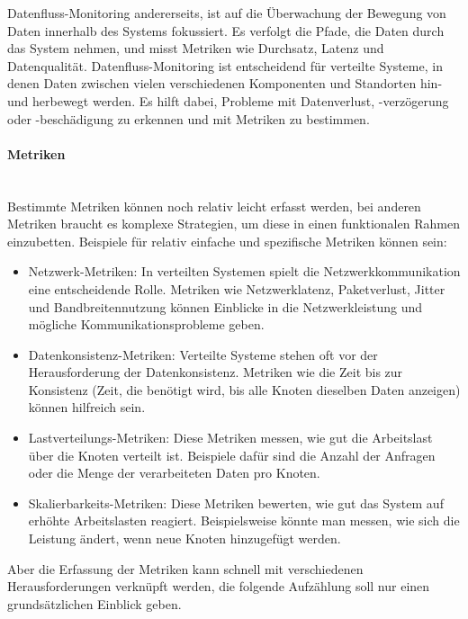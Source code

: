 Datenfluss-Monitoring andererseits, ist auf die Überwachung der Bewegung von Daten innerhalb des Systems fokussiert. Es verfolgt die Pfade, die Daten durch das System nehmen, und misst Metriken wie Durchsatz, Latenz und Datenqualität. Datenfluss-Monitoring ist entscheidend für verteilte Systeme, in denen Daten zwischen vielen verschiedenen Komponenten und Standorten hin- und herbewegt werden. Es hilft dabei, Probleme mit Datenverlust, -verzögerung oder -beschädigung zu erkennen und mit Metriken zu bestimmen.
\paragraph{Metriken\\\\}
Bestimmte Metriken können noch relativ leicht erfasst werden, bei anderen Metriken braucht es komplexe Strategien, um diese in einen funktionalen Rahmen einzubetten. Beispiele für relativ einfache und  spezifische Metriken können sein: 
\begin{itemize}
\item Netzwerk-Metriken: In verteilten Systemen spielt die Netzwerkkommunikation eine entscheidende Rolle. Metriken wie Netzwerklatenz, Paketverlust, Jitter und Bandbreitennutzung können Einblicke in die Netzwerkleistung und mögliche Kommunikationsprobleme geben.
\item Datenkonsistenz-Metriken: Verteilte Systeme stehen oft vor der Herausforderung der Datenkonsistenz. Metriken wie die Zeit bis zur Konsistenz (Zeit, die benötigt wird, bis alle Knoten dieselben Daten anzeigen) können hilfreich sein.
\item Lastverteilungs-Metriken: Diese Metriken messen, wie gut die Arbeitslast über die Knoten verteilt ist. Beispiele dafür sind die Anzahl der Anfragen oder die Menge der verarbeiteten Daten pro Knoten.
\item Skalierbarkeits-Metriken: Diese Metriken bewerten, wie gut das System auf erhöhte Arbeitslasten reagiert. Beispielsweise könnte man messen, wie sich die Leistung ändert, wenn neue Knoten hinzugefügt werden.
\end{itemize}
Aber die Erfassung der Metriken kann schnell mit verschiedenen Herausforderungen verknüpft werden, die folgende Aufzählung soll nur einen grundsätzlichen Einblick geben. 
